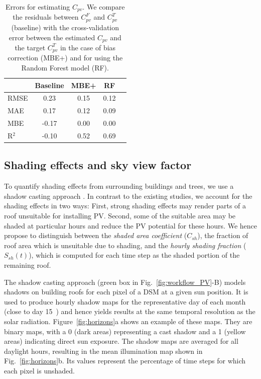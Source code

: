 \begin{table}[tb]
\centering
\footnotesize
\begin{tabular}{lcccc}
\hline
      & \textbf{Baseline} & \textbf{MBE+}  & \textbf{RF}   \\ \hline
RMSE  & 0.23     & 0.15  & 0.12 \\
MAE   & 0.17     & 0.12  & 0.09 \\
MBE   & -0.17    & 0.00  & 0.00 \\
R$^2$ & -0.10    & 0.52  & 0.69 \\ \hline
\end{tabular}
\caption{Errors for estimating $C_{pv}$. We compare the residuals between $C_{pv}^F$ and $C_{pv}^T$ (baseline) with the cross-validation error between the estimated $C_{pv}$ and the target $C_{pv}^T$ in the case of bias correction (MBE+) and for using the Random Forest model (RF).}
\label{tab:errors_Cpv}
\end{table}


\subsection{Shading effects and sky view factor}
\label{shade}
\label{svf}

To quantify shading effects from surrounding buildings and trees, we use a shadow casting approach \cite{buffat_scalable_2018, desthieux_solar_2018, klauser_solarpotentialanalyse_2016, ramirez_camargo_spatio-temporal_2015}. 
In contrast to the existing studies, we account for the shading effects in two ways:
First, strong shading effects may render parts of a roof unsuitable for installing PV. 
Second, some of the suitable area may be shaded at particular hours and reduce the PV potential for these hours. We hence propose to distinguish between the \textit{shaded area coefficient} ($C_{sh}$), the fraction of roof area which is unsuitable due to shading, and the \textit{hourly shading fraction} ($S_{sh}(t)$), which is computed for each time step as the shaded portion of the remaining roof. 

The shadow casting approach (green box in Fig.~\ref{fig:workflow_PV}-B) models shadows on building roofs for each pixel of a DSM at a given sun position. It is used to produce hourly shadow maps for the representative day of each month (close to day 15~\cite{desthieux_solar_2018}) and hence yields results at the same temporal resolution as the solar radiation.
Figure~\ref{fig:horizons}a shows an example of these maps. They are binary maps, with a 0 (dark areas) representing a cast shadow and a 1 (yellow areas) indicating direct sun exposure. The shadow maps are averaged for all daylight hours, resulting in the mean illumination map shown in Fig.~\ref{fig:horizons}b. Its values represent the percentage of time steps for which each pixel is unshaded.

